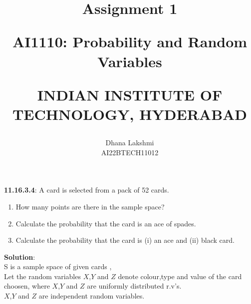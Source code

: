 \documentclass[journal,12pt,onecolumn]{IEEEtran}
\begin{document}
 \let\vec\mathbf 
  
  
  


 \vspace{3cm}

 \title{ Assignment 1 
  
         \Large AI1110: Probability and Random Variables 
  
          INDIAN INSTITUTE OF TECHNOLOGY, HYDERABAD 
 } 
 \author{ Dhana Lakshmi 
          
         AI22BTECH11012
 } 
  
 \maketitle 
  
  
 \bigskip 
 \renewcommand{\thefigure}{\theenumi} 
 \renewcommand{\thetable}{\theenumi} 
 \textbf{11.16.3.4}: 
 A card is selected from a pack of 52 cards.
 \begin{enumerate}[label=(\alph*)] 
                 \item How many points are there in the sample space?
                 \item Calculate the probability that the card is an ace of spades.
                 \item Calculate the probability that the card is (i) an ace and (ii) black card.
 \end{enumerate}
  \textbf{Solution}:\\
 S is a sample space of given cards , \\
 Let the random variables  $X$,$Y$ and $Z$ denote colour,type and value of the card choosen, where $X$,$Y$ and $Z$ are uniformly distributed r.v's.\\
 $X$,$Y$ and $Z$ are independent random variables. 
 
\end{document}
